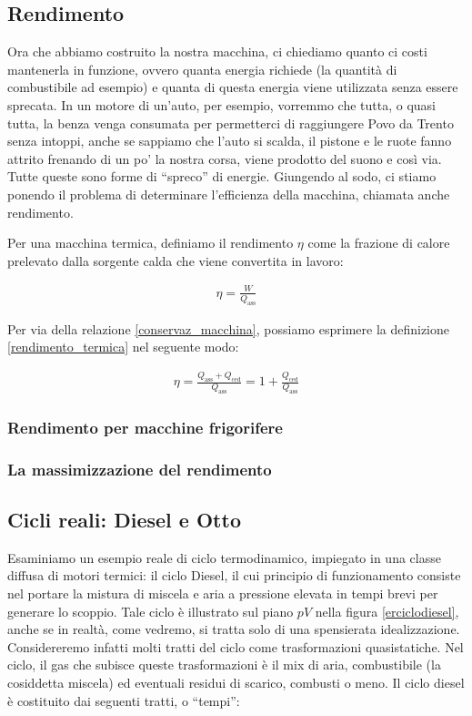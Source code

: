 \subsection{Rendimento}
Ora che abbiamo costruito la nostra macchina, ci chiediamo quanto ci
costi mantenerla in funzione, ovvero quanta energia richiede (la quantità
di combustibile ad esempio) e quanta di questa energia viene utilizzata
senza essere sprecata. In un motore di un'auto, per esempio, vorremmo che
tutta, o quasi tutta, la benza venga consumata per permetterci di raggiungere
Povo da Trento senza intoppi, anche se sappiamo che l'auto si scalda, il pistone
e le ruote fanno attrito frenando di un po' la nostra corsa, viene prodotto
del suono e così via. Tutte queste sono forme di ``spreco'' di energie.
Giungendo al sodo, ci stiamo ponendo il problema
di determinare l'efficienza della macchina, chiamata anche rendimento.

Per una macchina termica, definiamo il rendimento $\eta$ come
la frazione di calore prelevato dalla sorgente calda che
viene convertita in lavoro:

\begin{align}
    \eta = \frac{W}{Q_\text{ass}}\label{rendimento_termica}
\end{align}

\noindent Per via della relazione \ref{conservaz_macchina},
possiamo esprimere la definizione \ref{rendimento_termica}
nel seguente modo:

\begin{align*}
    \eta = \frac{Q_\text{ass} + Q_\text{ced}}{Q_\text{ass}} = 1 + \frac{Q_\text{ced}}{Q_\text{ass}}
\end{align*}

\subsubsection*{Rendimento per macchine frigorifere}

\subsubsection*{La massimizzazione del rendimento}

\subsection[Cicli Diesel e Otto]{Cicli reali: Diesel e Otto}
Esaminiamo un esempio reale di ciclo termodinamico, impiegato in
una classe diffusa di motori termici: il ciclo Diesel, il cui
principio di funzionamento consiste nel portare la mistura di
miscela e aria a pressione elevata in tempi brevi per generare
lo scoppio. Tale ciclo
è illustrato sul piano $pV$ nella figura \ref{erciclodiesel}, anche
se in realtà, come vedremo, si tratta solo di una spensierata idealizzazione.
Considereremo infatti molti tratti del ciclo come trasformazioni
quasistatiche. Nel ciclo, il gas che subisce queste trasformazioni
è il mix di aria, combustibile (la cosiddetta miscela) ed
eventuali residui di scarico, combusti o meno.
Il ciclo diesel è costituito dai seguenti tratti, o
``tempi'':

